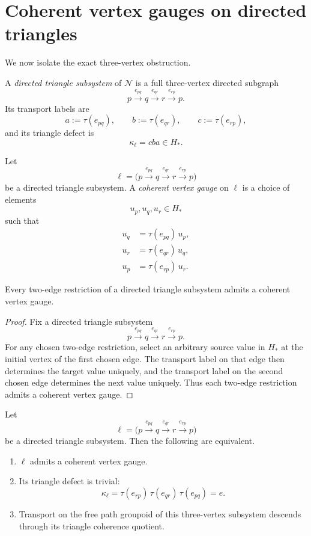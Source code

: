 \section{Coherent vertex gauges on directed triangles}
We now isolate the exact three-vertex obstruction.
\begin{definition}
	A \emph{directed triangle subsystem} of \(\mathcal N\) is a full
	three-vertex directed subgraph
	\[
		p\xrightarrow{e_{pq}}q\xrightarrow{e_{qr}}r\xrightarrow{e_{rp}}p.
	\]
	Its transport labels are
	\[
		a:=\tau(e_{pq}),
		\qquad
		b:=\tau(e_{qr}),
		\qquad
		c:=\tau(e_{rp}),
	\]
	and its triangle defect is
	\[
		\kappa_\ell=cba\in H_*.
	\]
\end{definition}
\begin{definition}
	Let
	\[
		\ell=
		\bigl(
		p\xrightarrow{e_{pq}}q\xrightarrow{e_{qr}}r\xrightarrow{e_{rp}}p
		\bigr)
	\]
	be a directed triangle subsystem. A \emph{coherent vertex gauge} on
	\(\ell\) is a choice of elements
	\[
		u_p,u_q,u_r\in H_*
	\]
	such that
	\begin{align*}
		u_q & = \tau(e_{pq})\,u_p, \\
		u_r & = \tau(e_{qr})\,u_q, \\
		u_p & = \tau(e_{rp})\,u_r.
	\end{align*}
\end{definition}
\begin{lemma}
	\label{lem:bridge-pairwise}
	Every two-edge restriction of a directed triangle subsystem admits a
	coherent vertex gauge.
\end{lemma}
\begin{proof}
	Fix a directed triangle subsystem
	\[
		p\xrightarrow{e_{pq}}q\xrightarrow{e_{qr}}r\xrightarrow{e_{rp}}p.
	\]
	For any chosen two-edge restriction, select an arbitrary source value in
	\(H_*\) at the initial vertex of the first chosen edge. The transport
	label on that edge then determines the target value uniquely, and the
	transport label on the second chosen edge determines the next value
	uniquely. Thus each two-edge restriction admits a coherent vertex
	gauge.
\end{proof}
\begin{proposition}
	\label{prop:bridge-global-coherence}
	Let
	\[
		\ell=
		\bigl(
		p\xrightarrow{e_{pq}}q\xrightarrow{e_{qr}}r\xrightarrow{e_{rp}}p
		\bigr)
	\]
	be a directed triangle subsystem. Then the following are equivalent.
	\begin{enumerate}[label=\textup{(\roman*)}]
		\item \(\ell\) admits a coherent vertex gauge.
		\item Its triangle defect is trivial:
		      \[
			      \kappa_\ell=\tau(e_{rp})\,\tau(e_{qr})\,\tau(e_{pq})=e.
		      \]
		\item Transport on the free path groupoid of this three-vertex subsystem
		      descends through its triangle coherence quotient.
	\end{enumerate}
\end{proposition}
